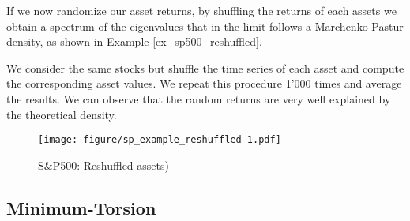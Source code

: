 If we now randomize our asset returns, by shuffling the returns of each assets we obtain a spectrum of the eigenvalues that in the limit follows a Marchenko-Pastur density, as shown in Example \ref{ex_sp500_reshuffled}. 

\begin{examp}\label{ex_sp500_reshuffled}
We consider the same stocks but shuffle the time series of each asset and compute the corresponding asset values. We repeat this procedure 1'000 times and average the results. We can observe that the random returns are very well explained by the theoretical density.
\end{examp}
\begin{figure}[!ht]
  \centering
  \texttt{[image: figure/sp\_example\_reshuffled-1.pdf]}
  \caption{S\&P500: Reshuffled assets)}
  \label{fig:sp_example_reshuffled}
\end{figure}



\subsection{Minimum-Torsion}\label{sec:min_torsion}

